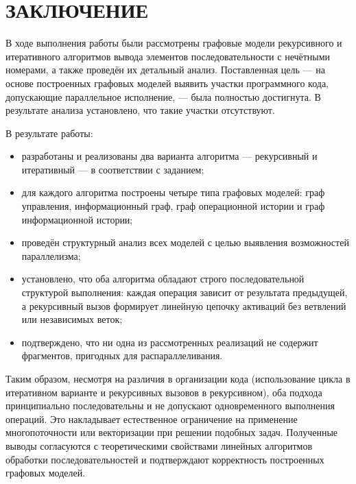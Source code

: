 \chapter*{ЗАКЛЮЧЕНИЕ}

В ходе выполнения работы были рассмотрены графовые модели рекурсивного и итеративного алгоритмов вывода элементов последовательности с нечётными номерами, а также проведён их детальный анализ. Поставленная цель --- на основе построенных графовых моделей выявить участки программного кода, допускающие параллельное исполнение, --- была полностью достигнута. В результате анализа установлено, что такие участки отсутствуют.

В результате работы:
\begin{itemize}
	\item разработаны и реализованы два варианта алгоритма --- рекурсивный и итеративный --- в соответствии с заданием;
	\item для каждого алгоритма построены четыре типа графовых моделей: граф управления, информационный граф, граф операционной истории и граф информационной истории;
	\item проведён структурный анализ всех моделей с целью выявления возможностей параллелизма;
	\item установлено, что оба алгоритма обладают строго последовательной структурой выполнения: каждая операция зависит от результата предыдущей, а рекурсивный вызов формирует линейную цепочку активаций без ветвлений или независимых веток;
	\item подтверждено, что ни одна из рассмотренных реализаций не содержит фрагментов, пригодных для распараллеливания.
\end{itemize}

Таким образом, несмотря на различия в организации кода (использование цикла в итеративном варианте и рекурсивных вызовов в рекурсивном), оба подхода принципиально последовательны и не допускают одновременного выполнения операций. Это накладывает естественное ограничение на применение многопоточности или векторизации при решении подобных задач. Полученные выводы согласуются с теоретическими свойствами линейных алгоритмов обработки последовательностей и подтверждают корректность построенных графовых моделей.
